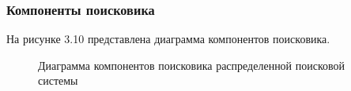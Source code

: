 \subsubsection{Компоненты поисковика}

На рисунке 3.10 представлена диаграмма компонентов поисковика.

\begin{figure}
\caption{Диаграмма компонентов поисковика распределенной поисковой системы}
\label{searcher/diagram_components:image}
\end{figure}